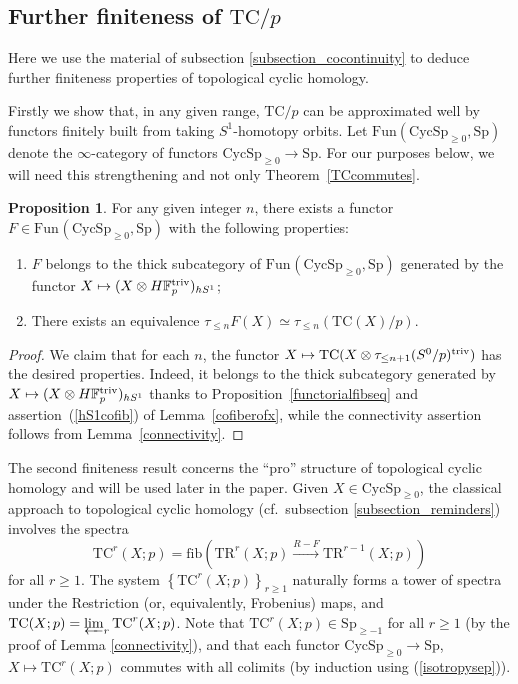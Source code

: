\documentclass{amsart}
\newcommand{\Sp}{\mathrm{Sp}}
\newcommand{\fun}{\mathrm{Fun}}
\theoremstyle{definition}
\newtheorem{proposition}[definition]{Proposition}
\newcommand{\sub}[1]{{\mbox{\rm \scriptsize #1}}}
\newcommand{\xto}{\xrightarrow}
\newcommand{\TR}{\mathrm{TR}}
\newcommand{\CycSp}{\mathrm{CycSp}}
\newcommand{\TC}{\mathrm{TC}}
\begin{document}
\subsection{Further finiteness of $\TC/p$}
Here we use the material of subsection \ref{subsection_cocontinuity} to deduce further finiteness properties of topological cyclic homology.

Firstly we show that, in any given range, $\TC/p$ can be approximated well by
functors finitely built from taking $S^1$-homotopy orbits. Let $\fun(\CycSp_{\geq 0}, \Sp)$ denote the $\infty$-category of functors $\CycSp_{\geq 0} \to \Sp$. 
For our purposes below, we will need this strengthening and not only
Theorem~\ref{TCcommutes}. 

\begin{proposition} 
\label{strong:finiteness}
For any given integer $n$, there exists a functor $F \in \fun_{}(\CycSp_{\geq 0}, \Sp)$ with the following properties:
\begin{enumerate}
\item $F$ belongs to the thick subcategory  of $\fun_{}(\CycSp_{\geq 0}, \Sp)$
generated by the functor $X \mapsto (X\otimes H\mathbb{F}_p^\sub{triv})_{hS^1}$;
\item There exists an equivalence $\tau_{\leq n} F(X) \simeq
\tau_{\leq n}(\TC(X)/p)$. \end{enumerate}
\end{proposition}
\begin{proof}
We claim that for each $n$, the functor $X \mapsto \TC(X\otimes \tau_{\leq
n+1}(S^0/p)^\sub{triv})$ has the desired properties. Indeed, it  belongs to the thick subcategory 
generated by  $X \mapsto (X\otimes H\mathbb{F}_p^\sub{triv})_{hS^1}$ 
thanks to Proposition~\ref{functorialfibseq} and
assertion~(\ref{hS1cofib}) of Lemma~\ref{cofiberofx}, while the connectivity assertion follows from Lemma~\ref{connectivity}.
\end{proof} 


The second finiteness result concerns the ``pro'' structure of topological
cyclic homology and will be used later in the paper. Given $X \in \CycSp_{\geq
0}$, the classical approach to topological cyclic homology (cf.~subsection \ref{subsection_reminders}) involves the spectra
\[ \TC^r(X;p) = \mathrm{fib}(\TR^r(X;p) \xto{R-F} \TR^{r-1}(X;p)) \]
for all $r\ge1$. The system $\left\{\TC^r(X;p)\right\}_{r \geq 1}$ naturally
forms a tower of spectra under the Restriction (or, equivalently, Frobenius) maps, and $\TC(X;p) = \varprojlim_r \TC^r(X;p)$. 
Note that $\TC^r(X;p) \in \Sp_{\geq -1}$ for all $r\ge1$ (by the proof of Lemma \ref{connectivity}), and that each functor $\CycSp_{\geq 0}\to\Sp$, $X
\mapsto \TC^r(X;p)$ commutes with all colimits (by induction using (\ref{isotropysep})).
\end{document}
